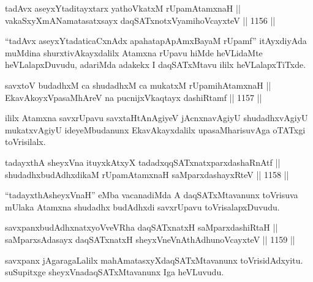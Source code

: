 \begin{shl}
tadAvx aseyxYtaditayxtarx yathoVkatxM rUpamAtamxnaH || \\
vakaSxyXmANamatasatxsayx daqSATxnotxV\s yamihoVcayxteV ||  1156 ||  
\end{shl}

\begin{artha}
``tadAvx aseyxYtadaticaCxnAdx apahatapApAmxBayaM rUpamf'' itAyxdiyAda muMdina shurxtivAkayxdalilx Atamxna rUpavu hiMde heVLidaMte heVLalapxDuvudu, adariMda adakekx I daqSATxMtavu ililx heVLalapxTiTxde.
\end{artha}

\begin{shl}
savxtoV budadhxM ca shudadhxM ca mukatxM rUpamihA\s \s tamxnaH || \\
EkavAkoyxVpasaMhAreV na pucnijxVkaqtayx dashiRtamf ||  1157 ||  
\end{shl}

\begin{artha}
ililx Atamxna savxrUpavu savxtaHtAnAgiyeV jAcnxnavAgiyU shudadhxvAgiyU mukatxvAgiyU ideyeMbudanunx EkavAkayxdalilx upasaMharisuvAga oTATxgi toVrisilalx.
\end{artha}


\begin{shl}
tadayxthA sheyxVna ituyxkAtxyX tadadxqqSATxnatxparxdashaRnAtf || \\
shudadhxbudAdhxdikaM rUpamAtamxnaH saMparxdashayxRteV ||  1158 ||  
\end{shl}

\begin{artha}
``tadayxthAsheyxVnaH'' eMba vacanadiMda A daqSATxMtavanunx toVrisuva mUlaka Atamxna shudadhx budAdhxdi savxrUpavu toVrisalapxDuvudu.
\end{artha}


\begin{shl}
savxpanxbudAdhxnatxyoVveVRha daqSATxnatxH saMparxdashiRtaH || \\
saMparxsAdasayx daqSATxnatxH sheyxVneVnAthAdhunoVcayxteV ||  1159 ||  
\end{shl}

\begin{artha}
savxpanx jAgaragaLalilx mahAmatasxyXdaqSATxMtavanunx toVrisidAdxyitu. suSupitxge sheyxVnadaqSATxMtavanunx Iga heVLuvudu.
\end{artha}

